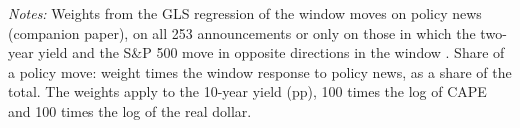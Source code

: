 \begin{table}[tp]\centering\small
\caption{FCI Weights Estimated without Information Shocks}\label{tab:jk}
\begin{flushleft}\footnotesize\textit{Notes:} Weights from the GLS regression of the window moves on policy news (companion paper), on all 253 announcements or only on those in which the two-year yield and the S\&P 500 move in opposite directions in the window \citep{jarocinski2020}. Share of a policy move: weight times the window response to policy news, as a share of the total. The weights apply to the 10-year yield (pp), 100 times the log of CAPE and 100 times the log of the real dollar.\end{flushleft}
\end{table}
